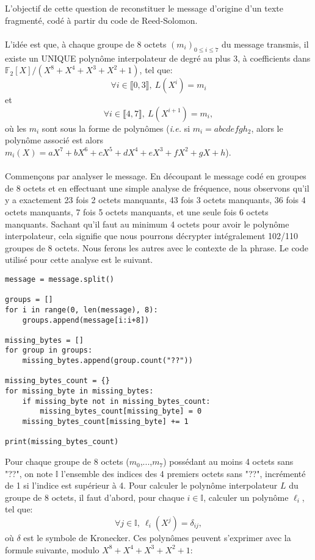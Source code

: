 \documentclass{article}
\begin{document}
L'objectif de cette question de reconstituer le message d'origine d'un texte fragmenté, codé à partir du code de Reed-Solomon.\\ \\
L'idée est que, à chaque groupe de 8 octets $(m_i)_{0 \le i \le 7}$ du message transmis, il existe un UNIQUE polynôme interpolateur de degré au plus $3$, à coefficients dans $\mathbb{F}_2[X]/(X^8 + X^4 + X^3 + X^2 + 1)$, tel que:
$$\forall i \in \llbracket 0, 3 \rrbracket, \ L(X^i) = m_i$$
et
$$\forall i \in \llbracket 4, 7 \rrbracket, \ L(X^{i+1}) = m_i,$$ où les $m_i$ sont sous la forme de polynômes (\textit{i.e.} si $m_i = abcdefgh_2$, alors le polynôme associé est alors $m_i(X) = aX^7 + bX^6 + cX^5 + dX^4 + eX^3 + fX^2 + gX + h$).\\ \\
Commençons par analyser le message. En découpant le message codé en groupes de 8 octets et en effectuant une simple analyse de fréquence, nous observons qu'il y a exactement 23 fois 2 octets manquants, 43 fois 3 octets manquants, 36 fois 4 octets manquants, 7 fois 5 octets manquants, et une seule fois 6 octets manquants. Sachant qu'il faut au minimum 4 octets pour avoir le polynôme interpolateur, cela signifie que nous pourrons décrypter intégralement 102/110 groupes de 8 octets. Nous ferons les autres avec le contexte de la phrase. Le code utilisé pour cette analyse est le suivant.

\begin{lstlisting}
message = message.split()

groups = []
for i in range(0, len(message), 8):
    groups.append(message[i:i+8])

missing_bytes = []
for group in groups:
    missing_bytes.append(group.count("??"))

missing_bytes_count = {}
for missing_byte in missing_bytes:
    if missing_byte not in missing_bytes_count:
        missing_bytes_count[missing_byte] = 0
    missing_bytes_count[missing_byte] += 1

print(missing_bytes_count)
\end{lstlisting}

Pour chaque groupe de 8 octets ($m_0$,...,$m_7$) possédant au moins 4 octets sans "??", on note $\mathbb{I}$ l'ensemble des indices des 4 premiers octets sans "??", incrémenté de 1 si l'indice est supérieur à 4. Pour calculer le polynôme interpolateur $L$ du groupe de 8 octets, il faut d'abord, pour chaque $i \in \mathbb{I}$, calculer un polynôme $\ell_i$, tel que: $$\forall j \in \mathbb{I}, \ \ell_i(X^j) = \delta_{ij},$$ où $\delta$ est le symbole de Kronecker. Ces polynômes peuvent s'exprimer avec la formule suivante, modulo $X^8 + X^4 + X^3 + X^2 + 1$:
\end{document}
